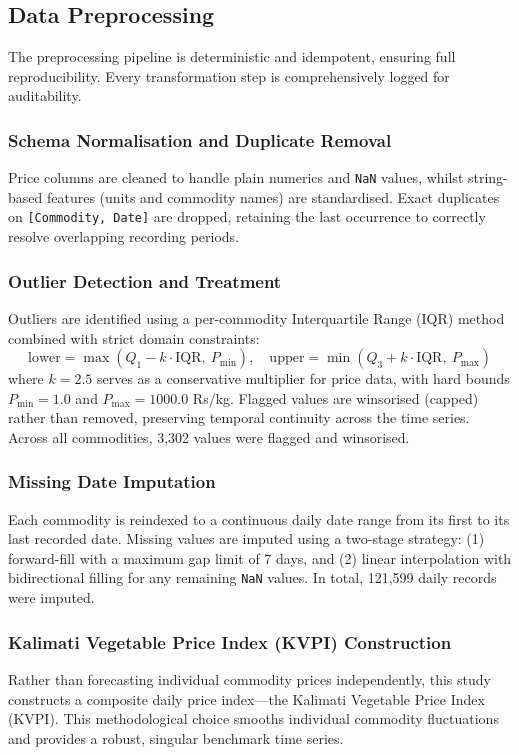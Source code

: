 \subsection{Data Preprocessing}
The preprocessing pipeline is deterministic and idempotent, ensuring full reproducibility. Every transformation step is comprehensively logged for auditability.

\subsubsection{Schema Normalisation and Duplicate Removal}
Price columns are cleaned to handle plain numerics and \texttt{NaN} values, whilst string-based features (units and commodity names) are standardised. Exact duplicates on \texttt{[Commodity, Date]} are dropped, retaining the last occurrence to correctly resolve overlapping recording periods.

\subsubsection{Outlier Detection and Treatment}
Outliers are identified using a per-commodity Interquartile Range (IQR) method combined with strict domain constraints:
\begin{equation}
\text{lower} = \max\left(Q_1 - k \cdot \text{IQR},\ P_{\min}\right), \quad \text{upper} = \min\left(Q_3 + k \cdot \text{IQR},\ P_{\max}\right)
\end{equation}
where $k = 2.5$ serves as a conservative multiplier for price data, with hard bounds $P_{\min} = 1.0$ and $P_{\max} = 1000.0$ Rs/kg. Flagged values are winsorised (capped) rather than removed, preserving temporal continuity across the time series. Across all commodities, 3,302 values were flagged and winsorised.

\subsubsection{Missing Date Imputation}
Each commodity is reindexed to a continuous daily date range from its first to its last recorded date. Missing values are imputed using a two-stage strategy: (1) forward-fill with a maximum gap limit of 7 days, and (2) linear interpolation with bidirectional filling for any remaining \texttt{NaN} values. In total, 121,599 daily records were imputed.

\subsubsection{Kalimati Vegetable Price Index (KVPI) Construction}
Rather than forecasting individual commodity prices independently, this study constructs a composite daily price index---the Kalimati Vegetable Price Index (KVPI). This methodological choice smooths individual commodity fluctuations and provides a robust, singular benchmark time series.

